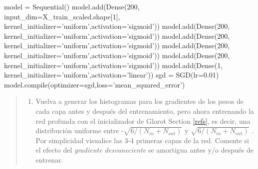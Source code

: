 \documentclass[11pt]{article}
\providecommand{\tightlist}{%
      \setlength{\itemsep}{0pt}\setlength{\parskip}{0pt}}
\newenvironment{Shaded}{}{}
\newcommand{\DecValTok}[1]{\textcolor[rgb]{0.25,0.63,0.44}{{#1}}}
\newcommand{\FloatTok}[1]{\textcolor[rgb]{0.25,0.63,0.44}{{#1}}}
\newcommand{\StringTok}[1]{\textcolor[rgb]{0.25,0.44,0.63}{{#1}}}
\newcommand{\NormalTok}[1]{{#1}}
\newcommand{\OperatorTok}[1]{\textcolor[rgb]{0.40,0.40,0.40}{{#1}}}
\newcommand{\BuiltInTok}[1]{{#1}}
\begin{document}
\begin{Shaded}
\begin{Highlighting}[]
\NormalTok{model }\OperatorTok{=}\NormalTok{ Sequential()}
\NormalTok{model.add(Dense(}\DecValTok{200}\NormalTok{, input_dim}\OperatorTok{=}\NormalTok{X_train_scaled.shape[}\DecValTok{1}\NormalTok{], kernel_initializer}\OperatorTok{=}\StringTok{'uniform'}\NormalTok{,activation}\OperatorTok{=}\StringTok{'sigmoid'}\NormalTok{))}
\NormalTok{model.add(Dense(}\DecValTok{200}\NormalTok{, kernel_initializer}\OperatorTok{=}\StringTok{'uniform'}\NormalTok{,activation}\OperatorTok{=}\StringTok{'sigmoid'}\NormalTok{))}
\NormalTok{model.add(Dense(}\DecValTok{200}\NormalTok{,  kernel_initializer}\OperatorTok{=}\StringTok{'uniform'}\NormalTok{,activation}\OperatorTok{=}\StringTok{'sigmoid'}\NormalTok{))}
\NormalTok{model.add(Dense(}\DecValTok{200}\NormalTok{, kernel_initializer}\OperatorTok{=}\StringTok{'uniform'}\NormalTok{,activation}\OperatorTok{=}\StringTok{'sigmoid'}\NormalTok{))}
\NormalTok{model.add(Dense(}\DecValTok{200}\NormalTok{, kernel_initializer}\OperatorTok{=}\StringTok{'uniform'}\NormalTok{,activation}\OperatorTok{=}\StringTok{'sigmoid'}\NormalTok{))}
\NormalTok{model.add(Dense(}\DecValTok{1}\NormalTok{, kernel_initializer}\OperatorTok{=}\StringTok{'uniform'}\NormalTok{,activation}\OperatorTok{=}\StringTok{'linear'}\NormalTok{))}
\NormalTok{sgd }\OperatorTok{=}\NormalTok{ SGD(lr}\OperatorTok{=}\FloatTok{0.01}\NormalTok{)}
\NormalTok{model.}\BuiltInTok{compile}\NormalTok{(optimizer}\OperatorTok{=}\NormalTok{sgd,loss}\OperatorTok{=}\StringTok{'mean_squared_error'}\NormalTok{)}
\end{Highlighting}
\end{Shaded}

\begin{quote}
\begin{enumerate}
\def\labelenumi{\alph{enumi})}
\setcounter{enumi}{3}
\tightlist
\item
  Vuelva a generar los histogramas para los gradientes de los pesos de
  cada capa antes y después del entrenamiento, pero ahora entrenando la
  red profunda con el inicializador de Glorot Section \ref{refs}, es
  decir, una distribución uniforme entre -\(\sqrt{6/(N_{in}+N_{out})}\)
  y \(\sqrt{6/(N_{in}+N_{out})}\) . Por simplicidad visualice las 3-4
  primeras capas de la red. Comente si el efecto del \emph{gradiente
  desvaneciente} se amortigua antes y/o después de entrenar.
\end{enumerate}
\end{quote}
\end{document}
